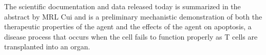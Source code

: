 \documentclass{article}
\begin{document}
The scientific documentation and data released today is summarized in the abstract by MRL Cui and is a preliminary mechanistic demonstration of both the therapeutic properties of the agent and the effects of the agent on apoptosis, a disease process that occurs when the cell fails to function properly as T cells are transplanted into an organ.
\end{document}
